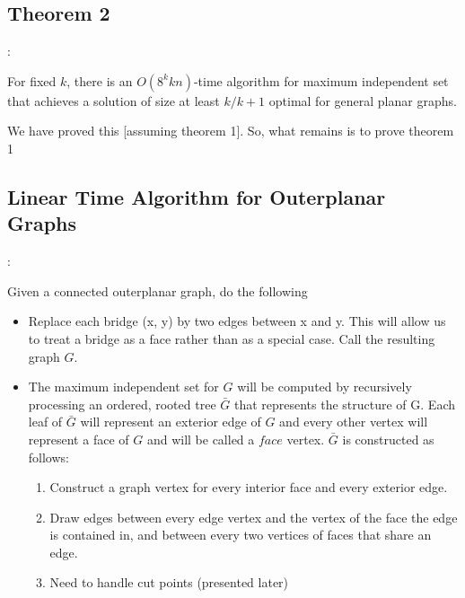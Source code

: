 \documentclass{beamer}
\begin{document}
\subsection{Theorem 2}
\begin{frame}{\secname : \subsecname}
    \begin{theorem}
        [Baker, 1994] For fixed $k$, there is an
$O(8^kkn)$-time algorithm for maximum independent set
that achieves a solution of size at least $k/k+1$ optimal for
general planar graphs. 
    \end{theorem}

    We have proved this [assuming theorem 1]. So, what remains is to prove theorem 1
\end{frame}
\subsection{Linear Time Algorithm for Outerplanar Graphs}
\begin{frame}{\secname : \subsecname}
    \begin{block}{Given a connected outerplanar graph, do the following}
    \begin{itemize}
        \item Replace each bridge (x, y) by two
        edges between x and y. This will allow us to treat a bridge as a face rather
        than as a special case. Call the resulting graph $G$.

        \item The maximum independent set for $G$ will be computed by recursively
processing an ordered, rooted tree $\bar{G}$ that represents the structure of G. Each
leaf of $\bar{G}$ will represent an exterior edge of $G$ and every other vertex will represent
a face of $G$ and will be called a $face$ vertex. $\bar{G}$ is constructed as follows:
        \begin{enumerate}
        \item Construct a graph vertex for every interior face and
        every exterior edge.

        \item Draw edges between every edge vertex and the vertex of the face the edge is contained in, and between
        every two vertices of faces that share an edge.

        \item Need to handle cut points (presented later)      
        \end{enumerate}
    \end{itemize}
    \end{block}

\end{frame}
\end{document}
